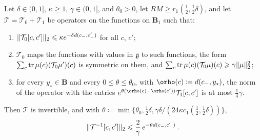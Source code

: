 \documentclass[11pt]{preprint}
\let\rho\orho
\DeclarePairedDelimiter{\norm}{\lVert}{\rVert}
\numberwithin{equation}{section}
\begin{document}
\begin{lemma}\label{lem:kernel-inverse}
Let $\delta \in (0, 1]$, $\kappa \geqslant 1$, $\gamma \in (0, 1]$, and $\theta_0 > 0$, let $RM \geqslant r_1(\frac{1}{2}, \frac{1}{2}\delta)$, and let $\mathcal T = \mathcal T_0 + \mathcal T_1$ be operators on the functions on $\mathbf B_1$ such that:
\begin{enumerate}[label=(\alph*)]
\item $\norm{\mathcal T_0[c, c']}_2 \leqslant \kappa e^{-\delta d(c_-, c'_-)}$ for all $c$, $c'$;
\item $\mathcal T_0$ maps the functions with values in $\mathfrak g$ to such functions, the form $\sum_c\operatorname{tr}\mu(c)(\mathcal T_0\mu')(c)$ is symmetric on them, and $\sum_c\tr\mu(c)(\mathcal T_0\mu)(c) \geqslant \gamma\norm\mu_2^2$;
\item for every $y_\star \in \mathbf B$ and every $0 \leqslant \theta \leqslant \theta_0$, with $\rho(c) \coloneqq d(c_-, y_\star)$, the norm of the operator with the entries $e^{\theta(\rho(c) - \rho(c'))}\mathcal T_1[c, c']$ is at most $\frac{1}{4}\gamma$.
\end{enumerate}
Then $\mathcal T$ is invertible, and with $\theta \coloneqq \min\{ \theta_0, \frac{1}{2}\delta, \gamma\delta/(24\kappa c_1(\frac{1}{2}, \frac{1}{2}\delta)) \}$,
\begin{equation}\label{eq:kernel-inverse}
    \norm{\mathcal T^{-1}[c, c']}_2 \leqslant \frac{2}{\gamma}\,e^{-\theta d(c_-, c'_-)}\;.
\end{equation}
\end{lemma}
\end{document}
